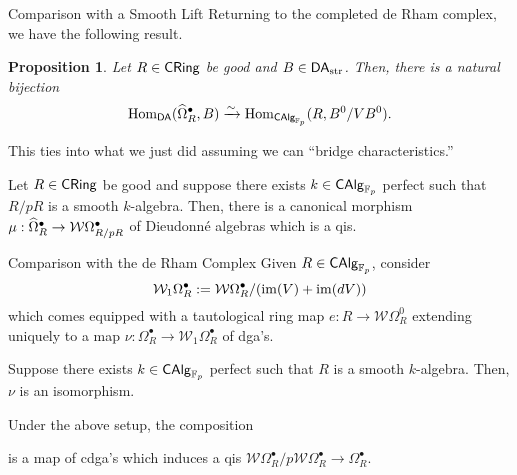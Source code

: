 \documentclass[aspectratio=1610]{beamer}
\newcommand{\DA}{\mathsf{DA}}
\newcommand{\str}{\textup{str}}
\newcommand{\W}{\mathcal{W}}
\newtheorem{proposition}{Proposition}
\begin{document}
\begin{frame}{Comparison with a Smooth Lift}
Returning to the completed de Rham complex, we have the following result.

\begin{proposition}
Let $R\in\operatorname{\mathsf{CRing}}$ be good and $B\in\DA_{\str}$. Then, there is a natural bijection
$$\Hom_{\DA}(\w{\Omega}_R^{\bullet},B)\xto{\sim}\Hom_{\CAlg_{\F_p}}(R,B^0/VB^0).$$
\end{proposition}

This ties into what we just did assuming we can ``bridge characteristics.''

\begin{theorem}
Let $R\in\operatorname{\mathsf{CRing}}$ be good and suppose there exists $k\in\operatorname{\mathsf{CAlg}}_{\mathbb{F}_p}$ perfect such that $R/pR$ is a smooth $k$-algebra. Then, there is a canonical morphism $\mu: \w{\Omega}_R^{\bullet}\to\W\Omega_{R/pR}^{\bullet}$ of Dieudonn\'{e} algebras which is a qis.
\end{theorem}
\end{frame}

\begin{frame}[fragile]{Comparison with the de Rham Complex}
Given $R\in\operatorname{\mathsf{CAlg}}_{\mathbb{F}_p}$, consider 
$$\W_1\Omega_R^{\bullet}:=\W\Omega_R^{\bullet}/(\im(V)+\im(dV))$$
which comes equipped with a tautological ring map $e: R\to\W\Omega_R^0$ extending uniquely to a map $\nu: \Omega_R^{\bullet}\to\W_1\Omega_R^{\bullet}$ of dga's.

\begin{theorem}
Suppose there exists $k\in\operatorname{\mathsf{CAlg}}_{\mathbb{F}_p}$ perfect such that $R$ is a smooth $k$-algebra. Then, $\nu$ is an isomorphism.
\end{theorem}

Under the above setup, the composition
\begin{center}
\end{center}
is a map of cdga's which induces a qis $\W\Omega_R^{\bullet}/p\W\Omega_R^{\bullet}\to\Omega_R^{\bullet}$.
\end{frame}
\end{document}
